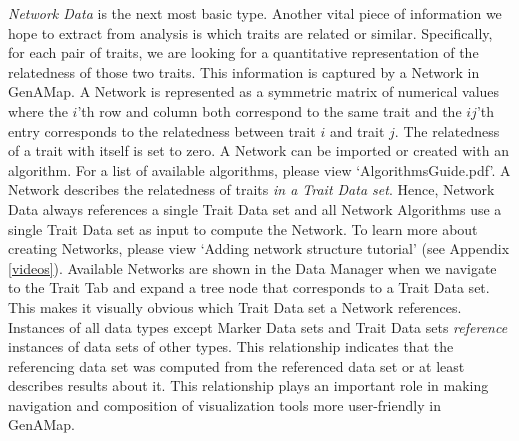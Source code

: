 \documentclass{article}
\begin{document}
{\it Network Data} is the next most basic type. Another vital piece of information we hope to extract from analysis is which traits are related or similar. Specifically, for each pair of traits, we are looking for a quantitative representation of the relatedness of those two traits. This information is captured by a Network in GenAMap. A Network is represented as a symmetric matrix of numerical values where the $i$'th row and column both correspond to the same trait and the $ij$'th entry corresponds to the relatedness between trait $i$ and trait $j$. The relatedness of a trait with itself is set to zero. A Network can be imported or created with an algorithm. For a list of available algorithms, please view `AlgorithmsGuide.pdf'. A Network describes the relatedness of traits {\it in a Trait Data set}. Hence, Network Data always references a single Trait Data set and all Network Algorithms use a single Trait Data set as input to compute the Network. To learn more about creating Networks, please view `Adding network structure tutorial' (see Appendix \ref{videos}). Available Networks are shown in the Data Manager when we navigate to the Trait Tab and expand a tree node that corresponds to a Trait Data set. This makes it visually obvious which Trait Data set a Network references. \\

Instances of all data types except Marker Data sets and Trait Data sets {\it reference} instances of data sets of other types. This relationship indicates that the referencing data set was computed from the referenced data set or at least describes results about it. This relationship plays an important role in making navigation and composition of visualization tools more user-friendly in GenAMap. \\
\end{document}

